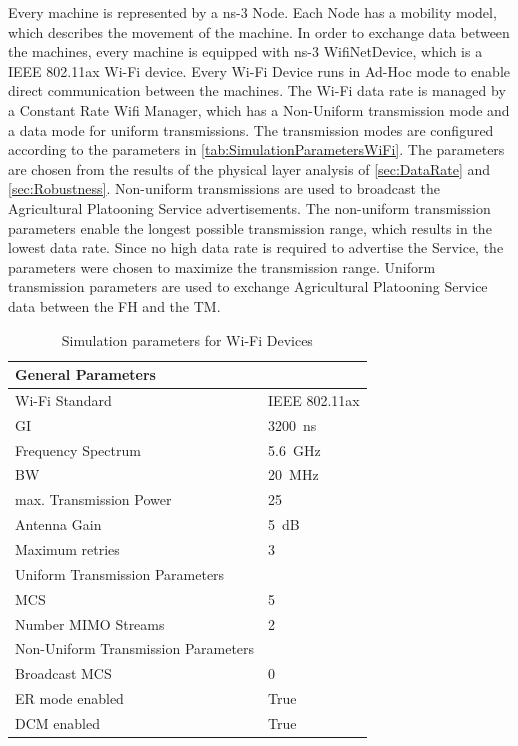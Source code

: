 Every machine is represented by a ns-3 Node. Each Node has a mobility model, which describes the movement of the machine.
In order to exchange data between the machines, every machine is equipped with ns-3 WifiNetDevice, which is a IEEE 802.11ax
Wi-Fi device. Every Wi-Fi Device runs in Ad-Hoc mode to enable direct communication
between the machines. The Wi-Fi data rate is managed by a Constant Rate Wifi Manager, which has a Non-Uniform
transmission mode and a data mode for uniform transmissions.
The transmission modes are configured according
to the parameters in \autoref{tab:SimulationParametersWiFi}.
The parameters are chosen from the results of the physical layer analysis of
\autoref{sec:DataRate} and \autoref{sec:Robustness}. Non-uniform transmissions are used to broadcast the Agricultural Platooning
Service advertisements. The non-uniform transmission parameters enable the longest possible
transmission range, which results in the lowest data rate. Since no high data rate is required to advertise the Service, the parameters were
chosen to maximize the transmission range. Uniform transmission parameters are used to exchange Agricultural Platooning Service data between
the \ac{FH} and the \ac{TM}. 

\begin{table}[H]
	\centering
	\begin{tabular}{p{5cm}p{4cm}}
		\toprule
		General Parameters & \\
		\midrule
		Wi-Fi Standard & IEEE 802.11ax\\
		\ac{GI} & \SI{3200}{\nano\second}\\
		Frequency Spectrum & \SI{5.6}{\giga\hertz}\\
		\ac{BW} & \SI{20}{\mega\hertz}\\
		max. Transmission Power & \SI{25}{\dBm}\\
		Antenna Gain & \SI{5}{\dB}\\
		Maximum retries & \num{3}\\
		\midrule
		Uniform Transmission Parameters & \\
		\midrule
		\ac{MCS} & \num{5}\\
		Number \ac{MIMO} Streams & \num{2}\\
		\midrule
		Non-Uniform Transmission Parameters & \\
		\midrule
		Broadcast \ac{MCS} & \num{0}\\
		\ac{ER} mode enabled & True\\
		\ac{DCM} enabled & True\\
		\bottomrule
	\end{tabular}
	\caption{Simulation parameters for Wi-Fi Devices}
	\label{tab:SimulationParametersWiFi}
\end{table}

